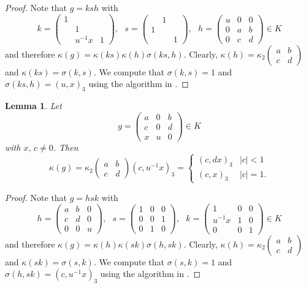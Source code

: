 \documentclass[12pt]{amsart}
\newcommand{\abs}[1]{\left|{#1}\right|}
\newcommand{\sm}[4]{\left(\begin{smallmatrix}{#1}&{#2}\\{#3}&{#4}\end{smallmatrix}\right)}
\newtheorem{lemma}[theorem]{Lemma}
\theoremstyle{remark}
\begin{document}
\begin{proof}
Note that $g=ksh$ with
\[
k=\begin{pmatrix}  1 &  & \\  & 1 &  \\  & u^{-1}x & 1 \end{pmatrix}, \ \ \ s=\begin{pmatrix} & 1 & \\ 1 & & \\  & & 1 \end{pmatrix}, \ \ \ h=\begin{pmatrix} u & 0 & 0 \\  0 & a & b \\ 0 & c & d \end{pmatrix} \in K
\]
and therefore $\kappa(g)=\kappa(ks)\kappa(h)\sigma(ks,h)$.
Clearly, $\kappa(h)=\kappa_2\sm{a}{b}{c}{d}$ and $\kappa(ks)=\sigma(k,s)$. 
We compute that $\sigma(k,s)=1$ and $\sigma(ks,h)=(u,x)_3$ using the algorithm in \cite[\S 2]{MR904946}.
\end{proof}



\begin{lemma}\label{lem k comp 32}
Let 
\[
g=\begin{pmatrix}  a &0 & b \\ c & 0 &  d\\  x & u & 0  \end{pmatrix}\in K
\]
with $x,\,c\ne 0$. Then 
\[
\kappa(g)=\kappa_2\sm{a}{b}{c}{d}(c,u^{-1}x)_3=\begin{cases} (c,dx)_3 & \abs{c}<1 \\ (c,x)_3 & \abs{c}=1. \end{cases}
\]
\end{lemma}
\begin{proof}
Note that $g=hsk$ with
\[
h=\begin{pmatrix}  a & b & 0 \\ c & d &  0\\  0&0  & u \end{pmatrix}, \ \ \ s=\begin{pmatrix}  1 &0 &0 \\ 0 & 0& 1\\  0& 1 &0  \end{pmatrix}, \ \ \ k=\begin{pmatrix} 1 & 0 & 0 \\  u^{-1}x & 1 & 0 \\ 0 & 0 & 1 \end{pmatrix} \in K
\]
and therefore $\kappa(g)=\kappa(h)\kappa(sk)\sigma(h,sk)$.
Clearly, $\kappa(h)=\kappa_2\sm{a}{b}{c}{d}$ and $\kappa(sk)=\sigma(s,k)$. 
We compute that $\sigma(s,k)=1$ and $\sigma(h,sk)=(c,u^{-1}x)_3$ using the algorithm in \cite[\S 2]{MR904946}.
\end{proof}
\end{document}
